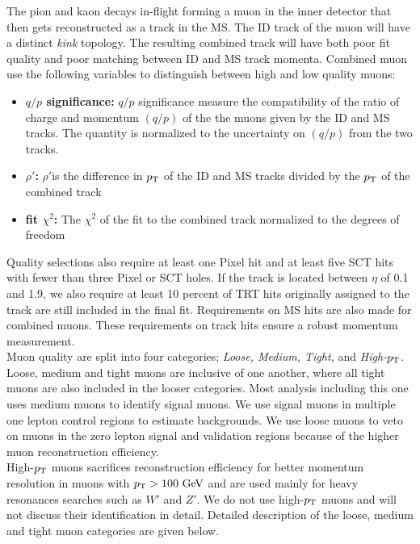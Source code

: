 \indent The pion and kaon decays in-flight forming a muon in the inner detector that then gets reconstructed as a track in the MS.  The ID track of the muon will have a distinct {\it kink} topology. The resulting combined track will have both poor fit quality and poor matching between ID and MS track momenta.  Combined muon use the following variables to distinguish between high and low quality muons: \\

\begin{itemize}
\item[] {\bf $q/p$ significance:} $q/p$ significance measure the compatibility of the ratio of charge and momentum $(q/p)$ of the the muons given by the ID and MS tracks. The quantity is normalized to the uncertainty on $(q/p)$ from the two tracks.
\item[] {\bf $\rho\prime$:} $\rho\prime$is the difference in $p_{\mathrm{T}}$ of the ID and MS tracks divided by the $p_{\mathrm{T}}$ of the combined track
\item[] {\bf fit $\chi^2$:} The $\chi^2$ of the fit to the combined track normalized to the degrees of freedom
\end{itemize}

\indent Quality selections also require at least one Pixel hit and at least five SCT hits with fewer than three Pixel or SCT holes.  If the track is located between $\eta$ of 0.1 and 1.9, we also require at least 10 percent of TRT hits originally assigned to the track are still included in the final fit.  Requirements on MS hits are also made for combined muons.  These requirements on track hits ensure a robust momentum measurement. \\

\indent Muon quality are split into four categories; {\it Loose, Medium, Tight,} and {\it High-$p_{\mathrm{T}}$}.  Loose, medium and tight muons are inclusive of one another, where all tight muons are also included in the looser categories.  Most analysis including this one uses medium muons to identify signal muons.  We use signal muons in multiple one lepton control regions to estimate backgrounds.  We use loose muons to veto on muons in the zero lepton signal and validation regions because of the higher muon reconstruction efficiency. \\

\indent High-$p_{\mathrm{T}}$ muons sacrifices reconstruction efficiency for better momentum resolution in muons with $\pt > 100 \gev$ and are used mainly for heavy resonances searches such as $W\prime$ and $Z\prime$.  We do not use high-$p_{\mathrm{T}}$ muons and will not discuss their identification in detail.  Detailed description of the loose, medium and tight muon categories are given below.  \\

